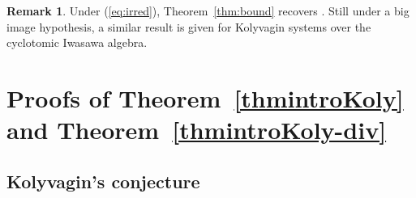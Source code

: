 \documentclass[10pt,reqno]{amsart}
\numberwithin{equation}{section}
\theoremstyle{plain}
\theoremstyle{definition}
\newtheorem{rmk}[thm]{Remark}
\newtheorem{rem}[thm]{Remark}
\theoremstyle{definition}
\theoremstyle{plain}
\theoremstyle{plain}
\theoremstyle{plain}
\theoremstyle{plain}
\theoremstyle{plain}
\theoremstyle{plain}
\newcommand{\CE}{\mathcal{E}}
\begin{document}

\begin{rem}
Under (\ref{eq:irred}), Theorem~\ref{thm:bound} recovers \cite[Thm.~2.2.2]{howard-gl2-type}. Still under a big image hypothesis, a similar result is given \cite[Thm.~9.6.1]{LZ-quadratic} for Kolyvagin systems over the cyclotomic Iwasawa algebra.
%
%
\end{rem}



\section{Proofs of Theorem~\ref{thmintroKoly} and Theorem~\ref{thmintroKoly-div}}\label{sec:Kolyproof}



\subsection{Kolyvagin's conjecture}\label{sec:Kolyf}  
\end{document}

